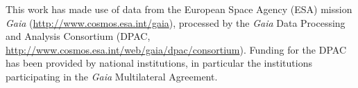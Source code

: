 \documentclass[modern, letterpaper]{aastex61}
\begin{document}

\acknowledgements

This work has made use of data from the European Space Agency (ESA) mission
{\it Gaia} (\url{http://www.cosmos.esa.int/gaia}), processed by the {\it Gaia}
Data Processing and Analysis Consortium (DPAC,
\url{http://www.cosmos.esa.int/web/gaia/dpac/consortium}). Funding for the DPAC
has been provided by national institutions, in particular the institutions
participating in the {\it Gaia} Multilateral Agreement.



\end{document}
